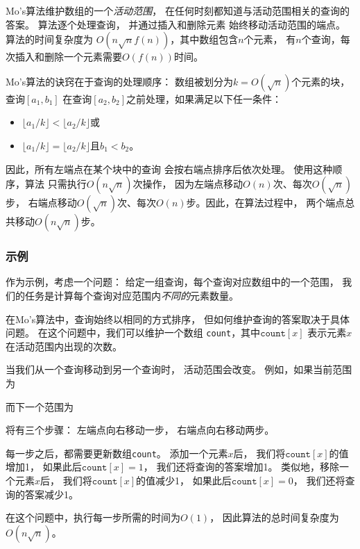 Mo's算法维护数组的一个\emph{活动范围}，
在任何时刻都知道与活动范围相关的查询的答案。
算法逐个处理查询，
并通过插入和删除元素
始终移动活动范围的端点。
算法的时间复杂度为
$O(n \sqrt n f(n))$，其中数组包含$n$个元素，
有$n$个查询，每次插入和删除一个元素需要$O(f(n))$时间。

Mo's算法的诀窍在于查询的处理顺序：
数组被划分为$k=O(\sqrt n)$个元素的块，
查询$[a_1,b_1]$
在查询$[a_2,b_2]$之前处理，如果满足以下任一条件：
\begin{itemize}
\item $\lfloor a_1/k \rfloor < \lfloor a_2/k \rfloor$或
\item $\lfloor a_1/k \rfloor = \lfloor a_2/k \rfloor$且$b_1 < b_2$。
\end{itemize}

因此，所有左端点在某个块中的查询
会按右端点排序后依次处理。
使用这种顺序，算法
只需执行$O(n \sqrt n)$次操作，
因为左端点移动$O(n)$次、每次$O(\sqrt n)$步，
右端点移动$O(\sqrt n)$次、每次$O(n)$步。因此，在算法过程中，
两个端点总共移动$O(n \sqrt n)$步。

\subsubsection*{示例}

作为示例，考虑一个问题：
给定一组查询，每个查询对应数组中的一个范围，
我们的任务是计算每个查询对应范围内\emph{不同的}元素数量。

在Mo's算法中，查询始终以相同的方式排序，
但如何维护查询的答案取决于具体问题。
在这个问题中，我们可以维护一个数组
\texttt{count}，其中$\texttt{count}[x]$
表示元素$x$在活动范围内出现的次数。

当我们从一个查询移动到另一个查询时，
活动范围会改变。
例如，如果当前范围为
\begin{center}
\end{center}
而下一个范围为
\begin{center}
\end{center}
将有三个步骤：
左端点向右移动一步，
右端点向右移动两步。

每一步之后，都需要更新数组\texttt{count}。
添加一个元素$x$后，
我们将$\texttt{count}[x]$的值增加1，
如果此后$\texttt{count}[x]=1$，
我们还将查询的答案增加1。
类似地，移除一个元素$x$后，
我们将$\texttt{count}[x]$的值减少1，
如果此后$\texttt{count}[x]=0$，
我们还将查询的答案减少1。

在这个问题中，执行每一步所需的时间为$O(1)$，
因此算法的总时间复杂度为$O(n \sqrt n)$。